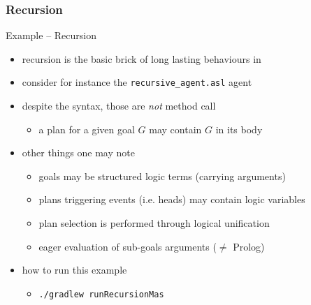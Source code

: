 \documentclass[presentation]{beamer}\mode<presentation>{\usetheme{AMSBolognaFC}}
\begin{document}
\subsubsection{Recursion}

\begin{frame}[c, allowframebreaks]{Example \theJasonExample{} -- Recursion}
    \begin{itemize}
        \item recursion is the basic brick of long lasting behaviours in \jason{}
        
        \vspace{.3cm}
        
        \item consider for instance the \texttt{recursive\_agent.asl} agent
        
        
        \vspace{.3cm}
        
        \item[!] despite the syntax, those are \emph{not} method call
        \begin{itemize}
            \item[$\rightarrow$] a plan for a given goal $G$ may contain $G$ in its body
        \end{itemize}
        
        \vspace{.3cm}
        
        \item other things one may note
        \begin{itemize}
            \item goals may be \alert{structured} logic terms (carrying arguments)
            \item plans triggering events (i.e. heads) may contain \alert{logic variables}
            \item plan selection is performed through \alert{logical unification}
            \item \alert{eager evaluation} of sub-goals arguments ($\neq$ Prolog)
        \end{itemize}
        
        \vspace{.3cm}
        
        \item how to run this example
        \begin{itemize}
            \item[\$] \texttt{./gradlew run\alert{Recursion}Mas}
        \end{itemize}
        
    \end{itemize}
\end{frame}
\end{document}
